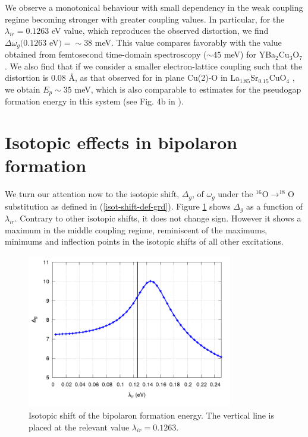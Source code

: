 We observe a monotonical behaviour with small dependency in the weak coupling regime becoming stronger with greater coupling values.
In particular, for the $\lambda_{ir}=0.1263$ eV value, which reproduces the observed distortion, we find $\Delta\omega_{g}(0.1263$ eV$) = \sim 38$ meV.
This value compares favorably with the value obtained from femtosecond time-domain spectroscopy ($\sim 45$ meV) for YBa$_2$Cu$_3$O$_7$ \cite{Demsar1999}. 
We also find that if we consider a smaller electron-lattice coupling such that the distortion is 0.08 \AA, as that observed for in plane Cu(2)-O in La$_{1.85}$Sr$_{0.15}$CuO$_4$ \cite{Bianconi1996}, we obtain $E_p \sim 35$ meV, which is also comparable to estimates for the pseudogap formation energy in this system (see Fig. 4b in \cite{Kusar2005}).

\section{Isotopic effects in bipolaron formation}
\label{sec:grd-isotopic}

We turn our attention now to the isotopic shift, $\Delta_g$, of $\omega_g$ under the $^{16}$O$\rightarrow ^{18}$O substitution as defined in (\ref{isot-shift-def-grd}).
Figure \ref{fig:isot_polaron_formation} shows $\Delta_g$ as a function of $\lambda_{ir}$.
Contrary to other isotopic shifts, it does not change sign.
However it shows a maximum in the middle coupling regime, reminiscent of the maximums, minimums and inflection points in the isotopic shifts of all other excitations.

\begin{figure}[ht!]
  \centering
  \includegraphics[width=0.8\textwidth]{images/isot-polaron-formation.png}
  \caption{Isotopic shift of the bipolaron formation energy. The vertical line is placed at the relevant value $\lambda_{ir}=0.1263$.}
  \label{fig:isot_polaron_formation}
\end{figure}

